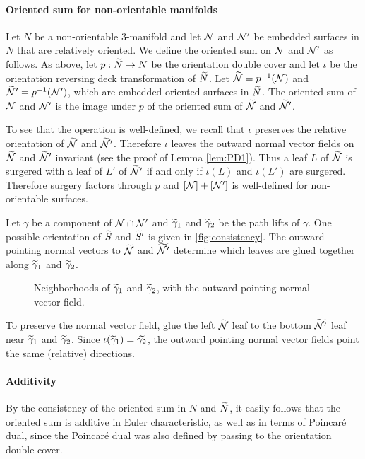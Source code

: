 \paragraph{Oriented sum for non-orientable manifolds} Let $N$ be a non-orientable 3-manifold and let $\mathcal{N}$ and $\mathcal{N}'$ be embedded surfaces in $N$ that are relatively oriented.
We define the oriented sum on $\mathcal{N}$ and $\mathcal{N}'$ as follows.
As above, let $p:\widetilde{N}\rightarrow N$ be the orientation double cover and let $\iota$ be the orientation reversing deck transformation of $\widetilde{N}$.
Let $\widetilde{\mathcal{N}}=p^{-1}(\mathcal{N})$ and $\widetilde{\mathcal{N}}'=p^{-1}(\mathcal{N}')$, which are embedded oriented surfaces in $\widetilde{N}$.
The oriented sum of $\mathcal{N}$ and $\mathcal{N}'$ is the image under $p$ of the oriented sum of $\widetilde{\mathcal{N}}$ and $\widetilde{\mathcal{N}}'$.

To see that the operation is well-defined, we recall that $\iota$ preserves the relative orientation of $\widetilde{\mathcal{N}}$ and $\widetilde{\mathcal{N}}'$.  Therefore $\iota$ leaves the outward normal vector fields on $\widetilde{\mathcal{N}}$ and $\widetilde{\mathcal{N}}'$ invariant (see the proof of Lemma \ref{lem:PD1}).
Thus a leaf $L$ of $\widetilde{\mathcal{N}}$ is surgered with a leaf of $L'$ of $\widetilde{\mathcal{N}}'$ if and only if $\iota(L)$ and $\iota(L')$ are surgered.
Therefore surgery factors through $p$ and $[\mathcal{N}]+[\mathcal{N}']$ is well-defined for non-orientable surfaces.

\begin{example}
  \label{ex:oriented-sum}
   Let $\gamma$ be a component of $\mathcal{N}\cap \mathcal{N}'$ and $\widetilde{\gamma}_1$ and $\widetilde{\gamma}_2$ be the path lifts of $\gamma$.
  One possible orientation of $\widetilde{S}$ and $\widetilde{S}'$ is given in  \autoref{fig:consistency}.  The outward pointing normal vectors to $\widetilde{\mathcal{N}}$ and $\widetilde{\mathcal{N}'}$ determine which leaves are glued together along $\widetilde{\gamma}_1$ and $\widetilde{\gamma}_2$.

\begin{figure}
  \centering
  \caption{Neighborhoods of $\widetilde{\gamma}_1$ and $\widetilde{\gamma}_2$, with the outward pointing normal vector field.}
  \label{fig:consistency}
\end{figure}

To preserve the normal vector field, glue the left $\widetilde{\mathcal{N}}$ leaf to the bottom $\widetilde{\mathcal{N}'}$ leaf near $\widetilde{\gamma}_1$ and $\widetilde{\gamma}_2$.
Since $\iota(\widetilde{\gamma}_1)=\widetilde{\gamma_2}$, the outward pointing normal vector fields point the same (relative) directions.
\end{example}

\paragraph{Additivity}
By the consistency of the oriented sum in $N$ and $\widetilde{N}$, it easily follows that the oriented sum is additive in Euler characteristic, as well as in terms of Poincar\'e dual, since the Poincar\'e dual was also defined by passing to the orientation double cover.
